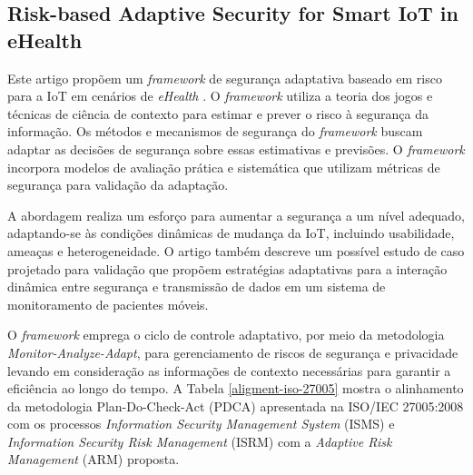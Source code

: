 \documentclass[tid,table]{texufpel} %
\begin{document}
\subsection{Risk-based Adaptive Security for Smart IoT in eHealth} %

Este artigo propõem um \textit{framework} de segurança adaptativa baseado em risco para a IoT em cenários de \textit{eHealth} \cite{habtamu12}. O \textit{framework} utiliza a teoria dos jogos e técnicas de ciência de contexto para estimar e prever o risco à segurança da informação. Os métodos e mecanismos de segurança do \textit{framework} buscam adaptar as decisões de segurança sobre essas estimativas e previsões. O \textit{framework} incorpora modelos de avaliação prática e sistemática que utilizam métricas de segurança para validação da adaptação.

A abordagem realiza um esforço para aumentar a segurança a um nível adequado, adaptando-se às condições dinâmicas de mudança da IoT, incluindo usabilidade, ameaças e heterogeneidade. O artigo também descreve um possível estudo de caso projetado para validação que propõem estratégias adaptativas para a interação dinâmica entre segurança e transmissão de dados em um sistema de monitoramento de pacientes móveis.

O \textit{framework} emprega o ciclo de controle adaptativo, por meio da metodologia \textit{Monitor-Analyze-Adapt}, para gerenciamento de riscos de segurança e privacidade levando em consideração as informações de contexto necessárias para garantir a eficiência ao longo do tempo. A Tabela \ref{aligment-iso-27005} mostra o alinhamento da metodologia Plan-Do-Check-Act (PDCA) apresentada na ISO/IEC 27005:2008 com os processos \textit{Information Security Management System} (ISMS) e \textit{Information Security Risk Management} (ISRM) com a \textit{Adaptive Risk Management} (ARM) proposta.
\end{document}
